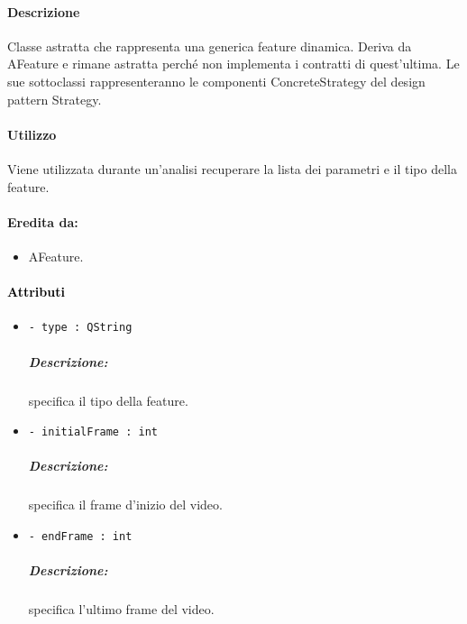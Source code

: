 \paragraph{Descrizione \\} Classe astratta che rappresenta una generica feature\g{} dinamica. Deriva da AFeature e rimane astratta perché non implementa i contratti di quest'ultima. Le sue sottoclassi rappresenteranno le componenti ConcreteStrategy del design pattern\g{} Strategy.

\paragraph{Utilizzo\\} Viene utilizzata durante un'analisi recuperare la lista dei parametri e il tipo della feature\g{}.

\paragraph{Eredita da:}
\begin{itemize}
	\item AFeature.
\end{itemize}

\paragraph{\textcolor{black}{Attributi\\}}
	\begin{itemize}
		\item \color{teal}\verb!- type : QString!
		\color{black}
		\subparagraph{Descrizione:} specifica il tipo della feature\g{}.
		\item \color{teal}\verb!- initialFrame : int!
		\color{black}
		\subparagraph{Descrizione:} specifica il frame d'inizio del video.
		\item \color{teal}\verb!- endFrame : int!
		\color{black}
		\subparagraph{Descrizione:} specifica l'ultimo frame del video.
	\end{itemize}

